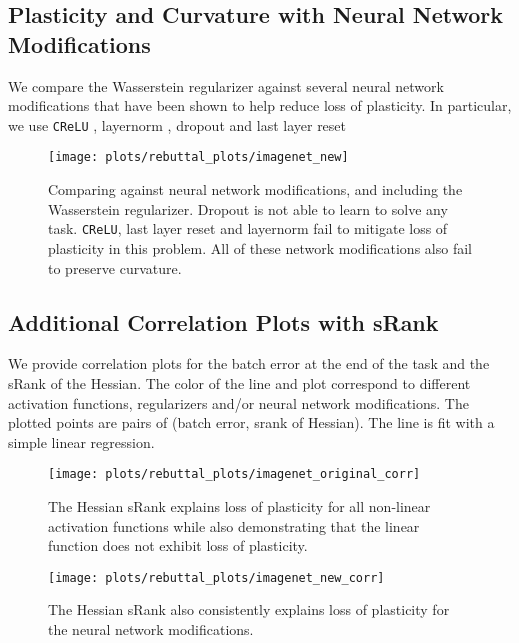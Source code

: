 \clearpage
\subsection{Plasticity and Curvature with Neural Network Modifications}
We compare the Wasserstein regularizer against several neural network modifications that have been shown to help reduce loss of plasticity. In particular, we use \texttt{CReLU} \citep{abbas23_loss_plast_contin_deep_reinf_learn, shang16_under}, layernorm \citep{lyle23_under, ba16_layer_normal}, dropout \citep{srivastava14_dropout} and last layer reset \citep{nikishin22_primac_bias_deep_reinf_learn}

\begin{figure}[h!]
  \centering
  \texttt{[image: plots/rebuttal\_plots/imagenet\_new]}
  \caption{
      Comparing against neural network modifications, and including the Wasserstein regularizer. Dropout is not able to learn to solve any task. \texttt{CReLU}, last layer reset and layernorm fail to mitigate loss of plasticity in this problem. All of these network modifications also fail to preserve curvature.
  }
  \label{fig:imagenet_new_results}
\end{figure}

\newpage
\subsection{Additional Correlation Plots with sRank}
We provide correlation plots for the batch error at the end of the task and the sRank of the Hessian.
The color of the line and plot correspond to different activation functions, regularizers and/or neural network modifications.
The plotted points are pairs of (batch error, srank of Hessian).
The line is fit with a simple linear regression.

\begin{figure}[h!]
  \centering
  \texttt{[image: plots/rebuttal\_plots/imagenet\_original\_corr]}
  \caption{
      The Hessian sRank explains loss of plasticity for all non-linear activation functions while also demonstrating that the linear function does not exhibit loss of plasticity.
  }
  \label{fig:imagenet_og_rank}
\end{figure}

\begin{figure}[h!]
  \centering
  \texttt{[image: plots/rebuttal\_plots/imagenet\_new\_corr]}
  \caption{
      The Hessian sRank also consistently explains loss of plasticity for the neural network modifications.
  }
  \label{fig:imagenet_new_rank}
\end{figure}

